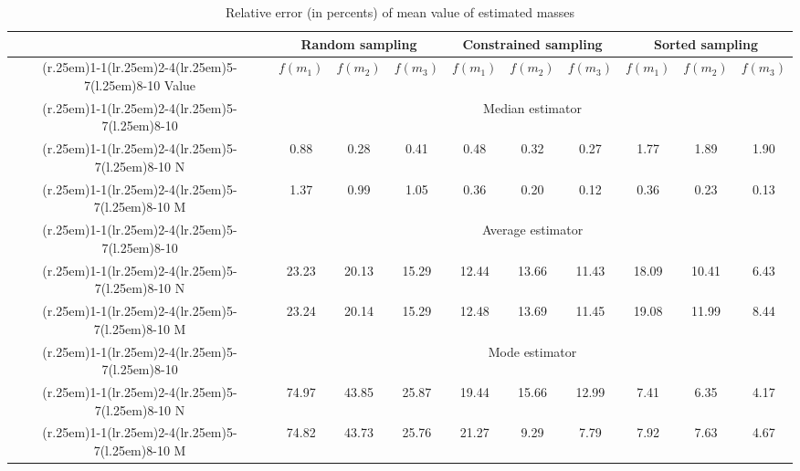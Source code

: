 \documentclass{aastex}
\newcommand{\customrule}{\cmidrule(r{.25em}){1-1}\cmidrule(lr{.25em}){2-4}\cmidrule(lr{.25em}){5-7}\cmidrule(l{.25em}){8-10}}
\begin{document}
\begin{table} 
\begin{center}
\caption{Relative error (in percents) of mean value of estimated masses }\label{tbl:estvalues}
\begin{tabular}{cccccccccc} \\ \toprule
 & \multicolumn{3}{c}{Random sampling} &  \multicolumn{3}{c}{Constrained sampling} & \multicolumn{3}{c}{Sorted sampling} \\ \customrule
Value      & $f(m_1)$ & $f(m_2)$ & $f(m_3)$ & $f(m_1)$ & $f(m_2)$ & $f(m_3)$& $f(m_1)$ & $f(m_2)$ & $f(m_3)$\\ \customrule
 & \multicolumn{9}{c}{Median estimator} \\ \customrule
 N &  0.88 &  0.28 &  0.41 &  0.48 &  0.32 &  0.27 &  1.77 &  1.89 & 1.90  \\ \customrule
 M &  1.37 &  0.99 &  1.05 &  0.36 &  0.20 &  0.12 &  0.36 &  0.23 & 0.13  \\ \customrule
 & \multicolumn{9}{c}{Average estimator} \\ \customrule
 N & 23.23 & 20.13 & 15.29 & 12.44 & 13.66 & 11.43 & 18.09 & 10.41 & 6.43  \\ \customrule
 M & 23.24 & 20.14 & 15.29 & 12.48 & 13.69 & 11.45 & 19.08 & 11.99 & 8.44  \\ \customrule
 & \multicolumn{9}{c}{Mode estimator} \\ \customrule
 N & 74.97 & 43.85 & 25.87 & 19.44 & 15.66 & 12.99 &  7.41 &  6.35 & 4.17  \\ \customrule
 M & 74.82 & 43.73 & 25.76 & 21.27 &  9.29 &  7.79 &  7.92 &  7.63 & 4.67  \\ \bottomrule
\end{tabular}
\end{center}
\end{table}
\end{document}
